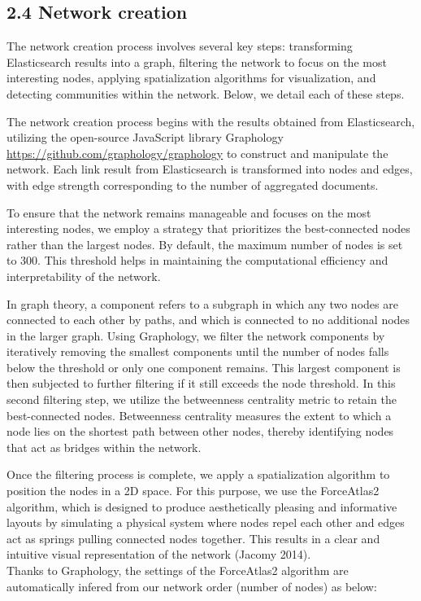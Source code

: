 \documentclass[
]{article}
\begin{document}
\hypertarget{network-creation}{%
\subsection{2.4 Network creation}\label{network-creation}}

The network creation process involves several key steps: transforming
Elasticsearch results into a graph, filtering the network to focus on
the most interesting nodes, applying spatialization algorithms for
visualization, and detecting communities within the network. Below, we
detail each of these steps.

The network creation process begins with the results obtained from
Elasticsearch, utilizing the open-source JavaScript library Graphology
\url{https://github.com/graphology/graphology} to construct and
manipulate the network. Each link result from Elasticsearch is
transformed into nodes and edges, with edge strength corresponding to
the number of aggregated documents.

To ensure that the network remains manageable and focuses on the most
interesting nodes, we employ a strategy that prioritizes the
best-connected nodes rather than the largest nodes. By default, the
maximum number of nodes is set to 300. This threshold helps in
maintaining the computational efficiency and interpretability of the
network.

In graph theory, a component refers to a subgraph in which any two nodes
are connected to each other by paths, and which is connected to no
additional nodes in the larger graph. Using Graphology, we filter the
network components by iteratively removing the smallest components until
the number of nodes falls below the threshold or only one component
remains. This largest component is then subjected to further filtering
if it still exceeds the node threshold. In this second filtering step,
we utilize the betweenness centrality metric to retain the
best-connected nodes. Betweenness centrality measures the extent to
which a node lies on the shortest path between other nodes, thereby
identifying nodes that act as bridges within the network.

Once the filtering process is complete, we apply a spatialization
algorithm to position the nodes in a 2D space. For this purpose, we use
the ForceAtlas2 algorithm, which is designed to produce aesthetically
pleasing and informative layouts by simulating a physical system where
nodes repel each other and edges act as springs pulling connected nodes
together. This results in a clear and intuitive visual representation of
the network (Jacomy 2014).\\
Thanks to Graphology, the settings of the ForceAtlas2 algorithm are
automatically infered from our network order (number of nodes) as below:
\end{document}
